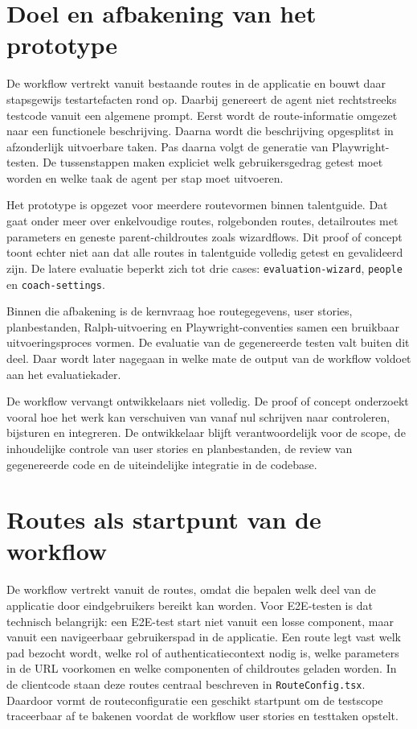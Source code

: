 \section{Doel en afbakening van het prototype}

De workflow vertrekt vanuit bestaande routes in de applicatie en bouwt daar stapsgewijs testartefacten rond op. Daarbij genereert de agent niet rechtstreeks testcode vanuit een algemene prompt. Eerst wordt de route-informatie omgezet naar een functionele beschrijving. Daarna wordt die beschrijving opgesplitst in afzonderlijk uitvoerbare taken. Pas daarna volgt de generatie van Playwright-testen. De tussenstappen maken expliciet welk gebruikersgedrag getest moet worden en welke taak de agent per stap moet uitvoeren.

Het prototype is opgezet voor meerdere routevormen binnen talentguide. Dat gaat onder meer over enkelvoudige routes, rolgebonden routes, detailroutes met parameters en geneste parent-childroutes zoals wizardflows. Dit proof of concept toont echter niet aan dat alle routes in talentguide volledig getest en gevalideerd zijn. De latere evaluatie beperkt zich tot drie cases: \texttt{evaluation-wizard}, \texttt{people} en \texttt{coach-settings}.

Binnen die afbakening is de kernvraag hoe routegegevens, user stories, planbestanden, Ralph-uitvoering en Playwright-conventies samen een bruikbaar uitvoeringsproces vormen. De evaluatie van de gegenereerde testen valt buiten dit deel. Daar wordt later nagegaan in welke mate de output van de workflow voldoet aan het evaluatiekader.

De workflow vervangt ontwikkelaars niet volledig. De proof of concept onderzoekt vooral hoe het werk kan verschuiven van vanaf nul schrijven naar controleren, bijsturen en integreren. De ontwikkelaar blijft verantwoordelijk voor de scope, de inhoudelijke controle van user stories en planbestanden, de review van gegenereerde code en de uiteindelijke integratie in de codebase.

\section{Routes als startpunt van de workflow}

De workflow vertrekt vanuit de routes, omdat die bepalen welk deel van de applicatie door eindgebruikers bereikt kan worden. Voor E2E-testen is dat technisch belangrijk: een E2E-test start niet vanuit een losse component, maar vanuit een navigeerbaar gebruikerspad in de applicatie. Een route legt vast welk pad bezocht wordt, welke rol of authenticatiecontext nodig is, welke parameters in de URL voorkomen en welke componenten of childroutes geladen worden. In de clientcode staan deze routes centraal beschreven in \texttt{RouteConfig.tsx}. Daardoor vormt de routeconfiguratie een geschikt startpunt om de testscope traceerbaar af te bakenen voordat de workflow user stories en testtaken opstelt.

